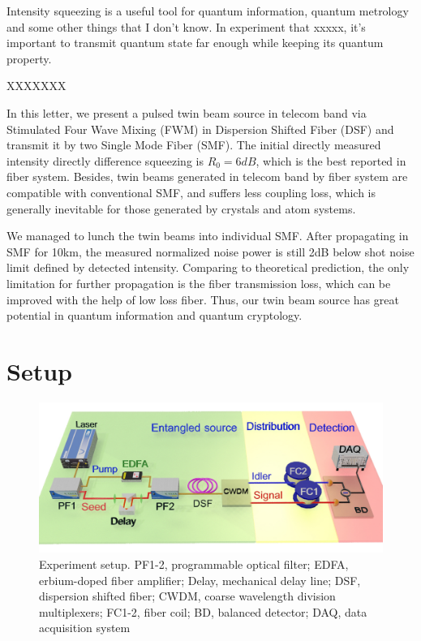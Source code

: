 \documentclass[9pt,twocolumn,twoside]{osajnl}
\begin{document}
Intensity squeezing is a useful tool for quantum information, quantum metrology and some other things that I don't know. In experiment that xxxxx, it's important to transmit quantum state far enough while keeping its quantum property.

XXXXXXX

In this letter, we present a pulsed twin beam source in telecom band via Stimulated Four Wave Mixing (FWM) in Dispersion Shifted Fiber (DSF) and transmit it by two Single Mode Fiber (SMF). The initial directly measured intensity directly difference squeezing is $R_{0}= 6 dB$, which is the best reported in fiber system. Besides, twin beams generated in telecom band by fiber system are compatible with conventional SMF, and suffers less coupling loss, which is generally inevitable for those generated by crystals and atom systems.%

We managed to lunch the twin beams into individual SMF.
After propagating in SMF for 10km, the measured normalized noise power is still 2dB below shot noise limit defined by detected intensity. Comparing to theoretical prediction, the only limitation for further propagation is the fiber transmission loss, which can be improved with the help of low loss fiber. Thus, our twin beam source has great potential in quantum information and quantum cryptology.


\section{Setup}

\begin{figure}[htbp]
\centering
\includegraphics[width=\linewidth]{fig1_3d_2.jpg}
\caption{Experiment setup.
PF1-2, programmable optical filter;
EDFA, erbium-doped fiber amplifier;
Delay, mechanical delay line;
DSF, dispersion shifted fiber;
CWDM, coarse wavelength division multiplexers;
FC1-2, fiber coil;
BD, balanced detector;
DAQ, data acquisition system}
\label{fig_setup}

\end{figure}
\end{document}

